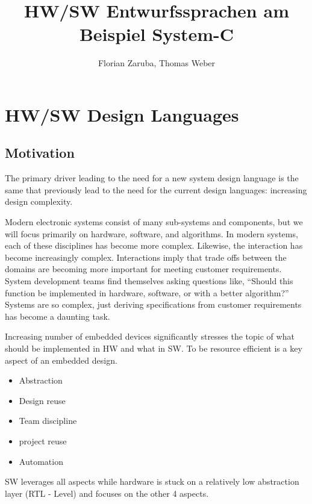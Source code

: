 \documentclass{article}
\begin{document}
	\title{HW/SW Entwurfssprachen am Beispiel System-C}
	\author{Florian Zaruba, Thomas Weber}

	\maketitle


	\section{HW/SW Design Languages}
	\subsection{Motivation}
	The primary driver leading to the need for a new system design language is the same that previously lead to the need for the current design languages: increasing design complexity.
	
	Modern electronic systems consist of many sub-systems and components, but we will focus primarily on hardware, software, and algorithms. In modern systems, each of these disciplines has become more complex. Likewise, the interaction has become increasingly complex.
	Interactions imply that trade offs between the domains are becoming more important for meeting customer requirements. System development teams find themselves asking questions like, “Should this function be implemented in hardware, software, or with a better algorithm?” Systems are so complex, just deriving specifications from customer requirements has become a daunting task.
	
	Increasing number of embedded devices significantly stresses the topic of what should be implemented in HW and what in SW. To be resource efficient is a key aspect of an embedded design.
	
	\begin{itemize}
		\item Abstraction
		\item Design reuse
		\item Team discipline
		\item project reuse
		\item Automation    
	\end{itemize}
	
	
	SW leverages all aspects while hardware is stuck on a relatively low abstraction layer (RTL - Level) and focuses on the other 4 aspects.
\end{document}
